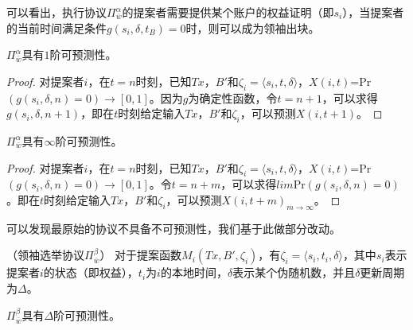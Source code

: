 可以看出，执行协议$\Pi^{\alpha}_{\bar{w}}$的提案者需要提供某个账户的权益证明（即$s_i$），当提案者的当前时间满足条件$g(s_i,\delta,t_B)=0$时，则可以成为领袖出块。

\begin{corollary}
$\Pi_{\bar{w}}^\alpha$具有$1$阶可预测性。	
\end{corollary}

\begin{proof}
 对提案者$i$，在$t=n$时刻，已知$Tx$，$B'$和$\zeta_i=\langle s_i,t,\delta\rangle$，$X(i,t)$=Pr$(g(s_i,\delta,n)=0)\rightarrow[0,1]$。因为$g$为确定性函数，令$t=n+1$，可以求得$g(s_i,\delta,n+1)$，即在$t$时刻给定输入$Tx$，$B'$和$\zeta_i$，可以预测$X(i,t+1)$。
\end{proof}

\begin{corollary}
$\Pi_{\bar{w}}^\alpha$具有$\infty$阶可预测性。	
\end{corollary}

\begin{proof}
对提案者$i$，在$t=n$时刻，已知$Tx$，$B'$和$\zeta_i=\langle s_i,t,\delta\rangle$，$X(i,t)$=Pr$(g(s_i,\delta,n)=0)\rightarrow[0,1]$。令$t=n+m$，可以求得$lim$Pr$(g(s_i,\delta,n)=0)$。即在$t$时刻给定输入$Tx$，$B'$和$\zeta_i$，可以预测$X(i,t+m)_{m\rightarrow \infty}$。
\end{proof}

可以发现最原始的协议不具备不可预测性，我们基于此做部分改动。

\begin{definition}
（领袖选举协议$\Pi^\beta_{\bar{w}}$） 对于提案函数$M_i(Tx,B',\zeta_i)$，有$\zeta_i=\langle s_i,t_i,\delta \rangle$，其中$s_i$表示提案者$i$的状态（即权益），$t_i$为$i$的本地时间，$\delta$表示某个伪随机数，并且$\delta$更新周期为$\Delta$。
\end{definition}

\begin{corollary}
$\Pi_{\bar{w}}^\beta$具有$\Delta$阶可预测性。	
\end{corollary}
